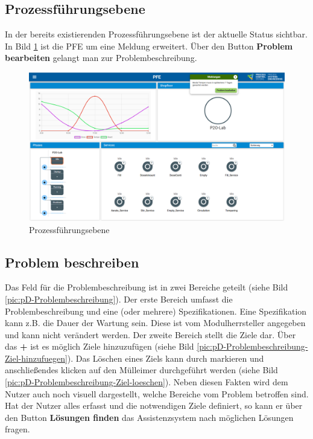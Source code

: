 \subsection{Prozessführungsebene}
In der bereits existierenden Prozessführungsebene ist der aktuelle Status sichtbar. In Bild \ref{pic:pD-PFE} ist die PFE um eine Meldung erweitert. Über den Button \textbf{Problem bearbeiten} gelangt man zur Problembeschreibung.
\begin{figure}[htbp]
\centering
\includegraphics[angle=90, scale=0.47]{DA_files/Bilder/Konzept/Skizze-PFE.png}
\caption{Prozessführungsebene}
\label{pic:pD-PFE}
\end{figure}

\subsection{Problem beschreiben}
Das Feld für die Problembeschreibung ist in zwei Bereiche geteilt (siehe Bild \ref{pic:pD-Problembeschreibung}). Der erste Bereich umfasst die Problembeschreibung und eine (oder mehrere) Spezifikationen. Eine Spezifikation kann z.B. die Dauer der Wartung sein. Diese ist vom Modulherrsteller angegeben und kann nicht verändert werden. Der zweite Bereich stellt die Ziele dar. Über das \textbf{+} ist es möglich Ziele hinzuzufügen (siehe Bild \ref{pic:pD-Problembeschreibung-Ziel-hinzufuegen}). Das Löschen eines Ziels kann durch markieren und anschließendes klicken auf den Mülleimer durchgeführt werden (siehe Bild \ref{pic:pD-Problembeschreibung-Ziel-loeschen}). Neben diesen Fakten wird dem Nutzer auch noch visuell dargestellt, welche Bereiche vom Problem betroffen sind.
Hat der Nutzer alles erfasst und die notwendigen Ziele definiert, so kann er über den Button \textbf{Lösungen finden} das Assistenzsystem nach möglichen Lösungen fragen.

